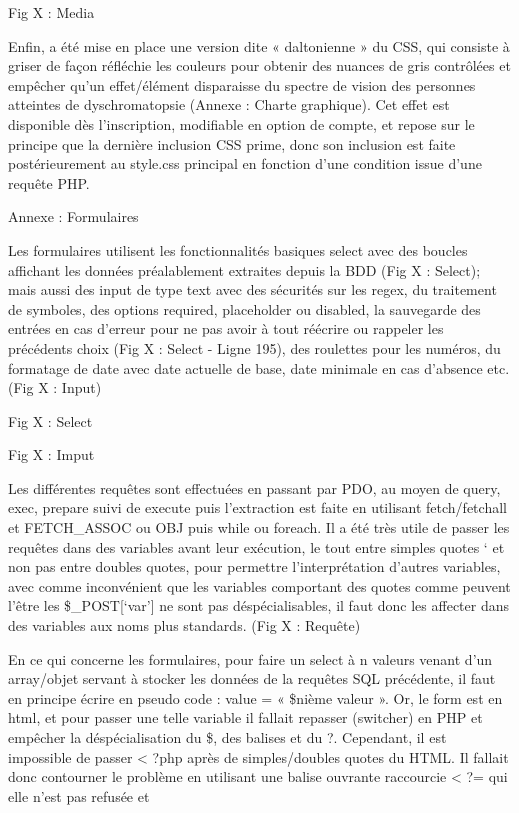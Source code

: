 \documentclass[12pt]{report}
\begin{document}
\bigskip
\par
Fig X : Media
\bigskip
\par
Enfin, a été mise en place une version dite « daltonienne » du CSS, qui consiste à griser de façon réfléchie les couleurs pour obtenir des nuances de gris contrôlées et empêcher qu’un effet/élément disparaisse du spectre de vision des personnes atteintes de dyschromatopsie (Annexe : Charte graphique). Cet effet est disponible dès l’inscription, modifiable en option de compte, et repose sur le principe que la dernière inclusion CSS prime, donc son inclusion est faite postérieurement au style.css principal en fonction d’une condition issue d’une requête PHP.
\bigskip
\par
Annexe : Formulaires
\bigskip
\par
Les formulaires utilisent les fonctionnalités basiques select avec des boucles affichant les données préalablement extraites depuis la BDD (Fig X : Select); mais aussi des input de type text avec des sécurités sur les regex, du traitement de symboles, des options required, placeholder ou
disabled, la sauvegarde des entrées en cas d’erreur pour ne pas avoir à tout réécrire ou rappeler les précédents choix (Fig X : Select - Ligne 195), des roulettes pour les numéros, du formatage de date avec date actuelle de base, date minimale en cas d’absence etc. (Fig X : Input)
\bigskip
\par
Fig X : Select
\bigskip
\par
Fig X : Imput
\bigskip
\par
Les différentes requêtes sont effectuées en passant par PDO, au moyen de query, exec, prepare
suivi de execute puis l’extraction est faite en utilisant fetch/fetchall et FETCH\_ASSOC ou OBJ puis
while ou foreach. Il a été très utile de passer les requêtes dans des variables avant leur exécution, le
tout entre simples quotes ‘ et non pas entre doubles quotes, pour permettre l’interprétation d’autres
variables, avec comme inconvénient que les variables comportant des quotes comme peuvent l’être
les \$\_POST[‘var’] ne sont pas déspécialisables, il faut donc les affecter dans des variables aux
noms plus standards. (Fig X : Requête)
\bigskip
\par
En ce qui concerne les formulaires, pour faire un select à n valeurs venant d’un array/objet servant à stocker les données de la requêtes SQL précédente, il faut en principe écrire en pseudo code : value = « \$nième valeur ». Or, le form est en html, et pour passer une telle variable il fallait
repasser (switcher) en PHP et empêcher la déspécialisation du \$, des balises et du ?. Cependant, il est impossible de passer < ?php après de simples/doubles quotes du HTML. Il fallait donc contourner le problème en utilisant une balise ouvrante raccourcie < ?= qui elle n’est pas refusée et
\end{document}
